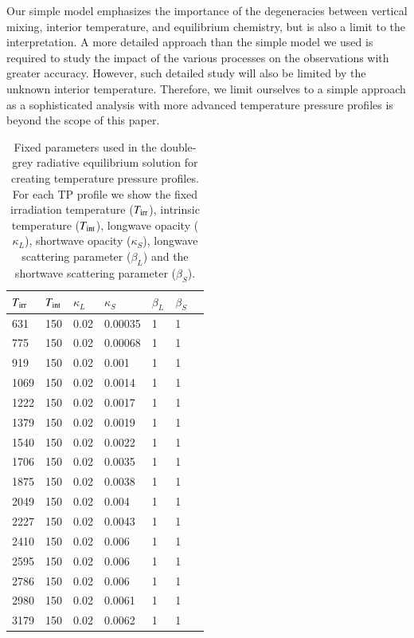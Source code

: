 Our simple model emphasizes the importance of the degeneracies between vertical mixing, interior temperature, and equilibrium chemistry, but is also a limit to the interpretation. A more detailed approach than the simple model we used is required to study the impact of the various processes on the observations with greater accuracy. However, such detailed study will also be limited by the unknown interior temperature. Therefore, we limit ourselves to a simple approach as a sophisticated analysis with more advanced temperature pressure profiles is beyond the scope of this paper.

\begin{table}[]
   \caption{Fixed parameters used in the double-grey radiative
equilibrium solution for creating temperature pressure profiles. For each TP profile we show the fixed irradiation temperature ($T_{\rm irr}$), intrinsic temperature ($T_{\rm int}$), longwave opacity ($\kappa_L$), shortwave opacity ($\kappa_S$), longwave scattering parameter ($\beta_{L}$) and the shortwave scattering parameter ($\beta_{S}$).}
   \centering
   \begin{tabular}{lllllll}
   \hline\hline
    $T_{\rm irr}$ & $T_{\rm int}$  & $\kappa_L$ & $\kappa_S$ &
$\beta_{L}$ & $\beta_{S}$ \\
   \hline
 631 & 150 & 0.02 & 0.00035 & 1 & 1 \\
 775 & 150 & 0.02 & 0.00068 & 1 & 1 \\
 919 & 150 & 0.02 & 0.001 & 1 & 1 \\
1069 & 150 & 0.02 & 0.0014 & 1 & 1 \\
1222 & 150 & 0.02 & 0.0017 & 1 & 1 \\
1379 & 150 & 0.02 & 0.0019 & 1 & 1 \\
1540 & 150 & 0.02 & 0.0022 & 1 & 1 \\
1706 & 150 & 0.02 & 0.0035 & 1 & 1 \\
1875 & 150 & 0.02 & 0.0038 & 1 & 1 \\
2049 & 150 & 0.02 & 0.004 & 1 & 1 \\
2227 & 150 & 0.02 & 0.0043 & 1 & 1 \\
2410 & 150 & 0.02 & 0.006 & 1 & 1 \\
2595 & 150 & 0.02 & 0.006 & 1 & 1 \\
2786 & 150 & 0.02 & 0.006 & 1 & 1 \\
2980 & 150 & 0.02 & 0.0061 & 1 & 1 \\
3179 & 150 & 0.02 & 0.0062 & 1 & 1 \\

   \hline
   \end{tabular}
   \label{P1:tab:TPparams}
\end{table}

